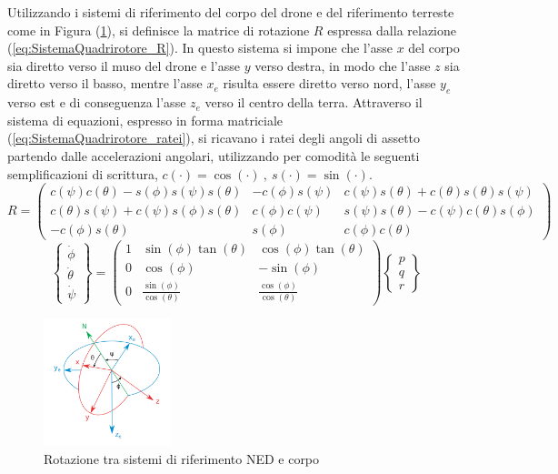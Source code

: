 Utilizzando i sistemi di riferimento del corpo del drone e del riferimento terreste come in Figura (\ref{fig:riferimenti}), si definisce la matrice di rotazione $R$ espressa dalla relazione (\ref{eq:SistemaQuadrirotore_R}). In questo sistema si impone che l'asse $x$ del corpo sia diretto verso il muso del drone e l'asse $y$ verso destra, in modo che l'asse $z$ sia diretto verso il basso, mentre l'asse $x_e$ risulta essere diretto verso nord, l'asse $y_e$ verso est e di conseguenza l'asse $z_e$ verso il centro della terra. 
Attraverso il sistema di equazioni, espresso in forma matriciale (\ref{eq:SistemaQuadrirotore_ratei}), si ricavano i ratei degli angoli di assetto partendo dalle accelerazioni angolari, utilizzando per  comodità le seguenti semplificazioni di scrittura, $ c(\cdot)=\cos(\cdot)\ ,\  s(\cdot) = \sin(\cdot) $.
\begin{equation}
R=
	\begin{pmatrix}
	c(\psi)c(\theta)-s(\phi)s(\psi)s(\theta) & -c(\phi)s(\psi) & c(\psi)s(\theta)+c(\theta)s(\theta)s(\psi) \\ 
	c(\theta) s(\psi)+c(\psi)s(\phi)s(\theta) & c(\phi)c(\psi) & s(\psi)s(\theta)-c(\psi)c(\theta)s(\phi) \\ 
	-c(\phi)s(\theta)	& s(\phi) & c(\phi)c(\theta)
	\end{pmatrix}
	\label{eq:SistemaQuadrirotore_R}
\end{equation}
\begin{equation}
	\begin{Bmatrix}
		\dot{\phi}\\
		\dot{\theta}\\
		\dot{\psi}
		\end{Bmatrix}=
	\begin{pmatrix}
		1 & \sin(\phi)\tan(\theta) & \cos(\phi)\tan(\theta) \\ 
		0 & \cos(\phi) & -\sin(\phi) \\ 
		0 & \frac{\sin(\phi)}{\cos(\theta)} & \frac{\cos(\phi)}{\cos(\theta)}
	\end{pmatrix}
	\begin{Bmatrix}
		p\\
		q\\
		r
	\end{Bmatrix}
	\label{eq:SistemaQuadrirotore_ratei}
\end{equation}

\begin{figure}
	\centering
	\includegraphics[width=0.33\textwidth]{SistemaQuadrirotore/Figure/eulerangles.png}
	\caption{Rotazione tra sistemi di riferimento NED e corpo \cite{eulero}}
	\label{fig:riferimenti}
\end{figure}


